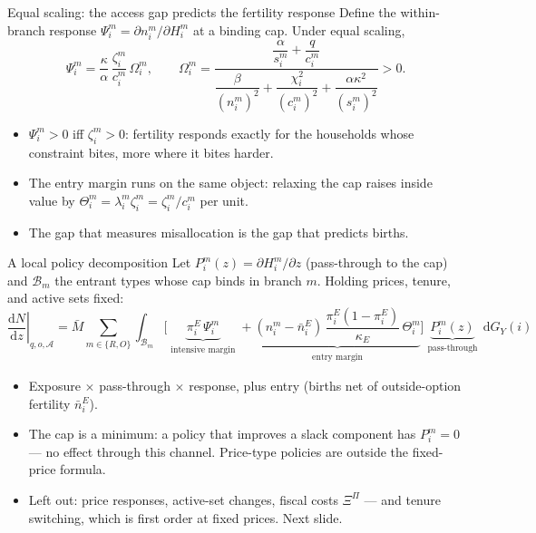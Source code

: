 \documentclass[11pt,aspectratio=169]{beamer}
\newcommand{\dd}{\mathrm d}
\newcommand{\1}{\mathbf 1}
\newcommand{\Mbar}{\bar M}
\begin{document}
\begin{frame}{Equal scaling: the access gap predicts the fertility response}
\small
Define the within-branch response $\Psi_i^m=\partial n_i^m/\partial H_i^m$ at a binding cap. Under equal scaling,
\[
\Psi_i^m
=
\frac{\kappa}{\alpha}\,
\frac{\zeta_i^m}{c_i^m}\,
\Omega_i^m,
\qquad
\Omega_i^m=
\frac{\dfrac{\alpha}{s_i^m}+\dfrac{q}{c_i^m}}
{\dfrac{\beta}{(n_i^m)^2}+\dfrac{\chi_i^2}{(c_i^m)^2}+\dfrac{\alpha\kappa^2}{(s_i^m)^2}}
>0 .
\]
\begin{itemize}\setlength{\itemsep}{0.4em}
  \item $\Psi_i^m>0$ iff $\zeta_i^m>0$: fertility responds exactly for the households whose constraint bites, more where it bites harder.
  \item The entry margin runs on the same object: relaxing the cap raises inside value by $\Theta_i^m=\lambda_i^m\zeta_i^m=\zeta_i^m/c_i^m$ per unit.
  \item The gap that measures misallocation is the gap that predicts births.
\end{itemize}
\end{frame}

\begin{frame}{A local policy decomposition}
\small
Let $P_i^m(z)=\partial H_i^m/\partial z$ (pass-through to the cap) and $\mathcal B_m$ the entrant types whose cap binds in branch $m$. Holding prices, tenure, and active sets fixed:
{\footnotesize
\[
\left.\frac{\dd N}{\dd z}\right|_{q,o,\mathcal A}
=
\Mbar\sum_{m\in\{R,O\}}\int_{\mathcal B_m}
\Bigg[
\underbrace{\pi_i^E\,\Psi_i^m}_{\substack{\text{intensive margin}}}
+
\underbrace{(n_i^m-\bar n_i^E)\,\frac{\pi_i^E(1-\pi_i^E)}{\kappa_E}\,\Theta_i^m}_{\substack{\text{entry margin}}}
\Bigg]
\underbrace{P_i^m(z)}_{\substack{\text{pass-through}}}
\,\dd G_Y(i)
\]}
\begin{itemize}\setlength{\itemsep}{0.35em}
  \item Exposure $\times$ pass-through $\times$ response, plus entry (births net of outside-option fertility $\bar n_i^E$).
  \item The cap is a minimum: a policy that improves a slack component has $P_i^m=0$ --- no effect through this channel. Price-type policies are outside the fixed-price formula.
  \item Left out: price responses, active-set changes, fiscal costs $\Xi^\Pi$ --- and tenure switching, which is first order at fixed prices. Next slide.
\end{itemize}
\end{frame}
\end{document}
